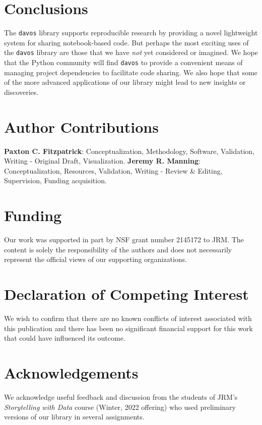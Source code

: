 \documentclass[preprint,12pt,a4paper]{elsarticle}
\begin{document}
\section{Conclusions}

The \texttt{davos} library supports reproducible research by providing
a novel lightweight system for sharing notebook-based code. But
perhaps the most exciting uses of the \texttt{davos} library are those
that we have \textit{not} yet considered or imagined. We hope that
the Python community will find \texttt{davos} to provide a convenient
means of managing project dependencies to facilitate code sharing. We
also hope that some of the more advanced applications of our library
might lead to new insights or discoveries.


\section*{Author Contributions}
\textbf{Paxton C. Fitzpatrick}: Conceptualization, Methodology,
Software, Validation, Writing - Original Draft,
Visualization. \textbf{Jeremy R. Manning}: Conceptualization,
Resources, Validation, Writing - Review \& Editing, Supervision, Funding
acquisition.

\section*{Funding}
Our work was supported in part by NSF grant number 2145172 to JRM.
The content is solely the responsibility of the authors and does not necessarily represent the official views of our supporting organizations.


\section*{Declaration of Competing Interest}
We wish to confirm that there are no known conflicts of interest associated with this publication and there has been no significant financial support for this work that could have influenced its outcome.


\section*{Acknowledgements}
We acknowledge useful feedback and discussion from the students of
JRM's \textit{Storytelling with Data} course (Winter, 2022 offering)
who used preliminary versions of our library in several assignments.



\end{document}
